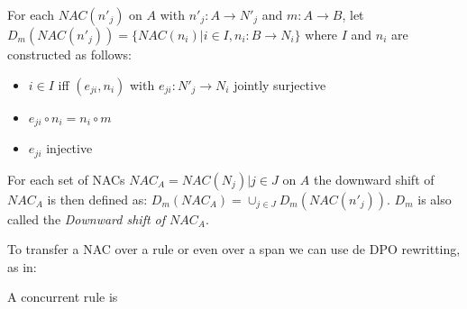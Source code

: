 \begin{definition}


For each $NAC(n'_j)$ on $A$ with $n'_j : A \rightarrow N'_j$ and $m : A \rightarrow B$, 
let $D_m(NAC(n'_j)) = \{ NAC(n_i)|i \in I, n_i : B \rightarrow N_i \}$ where $I$ and $n_i$ 
are constructed as follows:
\begin{itemize}
  \item $i \in I$ iff $(e_{ji}, n_i)$ with $e_{ji} : N'_j \rightarrow N_i$ jointly surjective 
  \item $e_{ji} \circ n_i = n_i \circ m$
  \item $e_{ji}$ injective
\end{itemize}

For each set of NACs $NAC_A = {NAC(N_j)| j \in J}$ on $A$ the downward shift of $NAC_A$ is then defined as: $D_m(NAC_A) = \cup_{j \in J}D_m(NAC(n'_j))$. $D_m$ is also called the \emph{Downward shift of $NAC_A$}.

\end{definition}

\begin{definition} To transfer a NAC over a rule or even over a span we can use de DPO rewritting, as in:


\end{definition}

\begin{definition}

A concurrent rule is
\end{definition}

\centerline{
}

